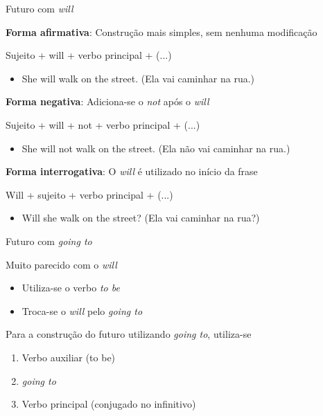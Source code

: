 \documentclass[compress,mathserif,xcolor=table]{beamer}
\begin{document}

\begin{frame}{Futuro com \textit{will}}

\textbf{Forma afirmativa}: Construção mais simples, sem nenhuma modificação

Sujeito + will + verbo principal + (...)
\begin{itemize}
    \item She will walk on the street. (Ela vai caminhar na rua.)
\end{itemize}

\vspace{0.25cm}

\textbf{Forma negativa}: Adiciona-se o \textit{not} após o \textit{will}

Sujeito + will + not + verbo principal + (...)
\begin{itemize}
    \item She will not walk on the street. (Ela não vai caminhar na rua.)
\end{itemize}

\vspace{0.25cm}

\textbf{Forma interrogativa}: O \textit{will} é utilizado no início da frase

Will + sujeito + verbo principal + (...)
\begin{itemize}
    \item Will she walk on the street? (Ela vai caminhar na rua?)
\end{itemize}

\end{frame}


\begin{frame}{Futuro com \textit{going to}}

Muito parecido com o \textit{will} 
\begin{itemize}
    \item Utiliza-se o verbo \textit{to be}
    \item Troca-se o \textit{will} pelo \textit{going to}
\end{itemize}

\vspace{0.5cm}

Para a construção do futuro utilizando \textit{going to}, utiliza-se

\begin{enumerate}
    \item Verbo auxiliar (to be)
    \item \textit{going to}
    \item Verbo principal (conjugado no infinitivo)
\end{enumerate}

\end{frame}
\end{document}
